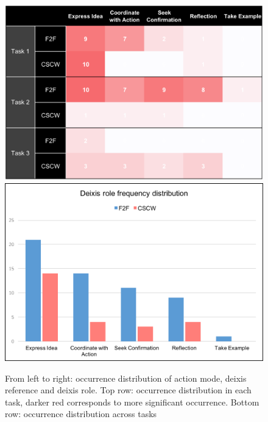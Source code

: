 \documentclass[12pt,twoside]{article}
\begin{document}
\begin{figure}
\endminipage\hfill
{}%
  \includegraphics[width=\linewidth]{img/deixis_role_a.png}
  \includegraphics[width=\linewidth]{img/deixis_role_b.png}
\endminipage
\caption{From left to right: occurrence distribution of action mode, deixis reference and deixis role. Top row: occurrence distribution in each task, darker red corresponds to more significant occurrence. Bottom row: occurrence distribution across tasks}\label{fig:yumin}
\end{figure}
\end{document}
